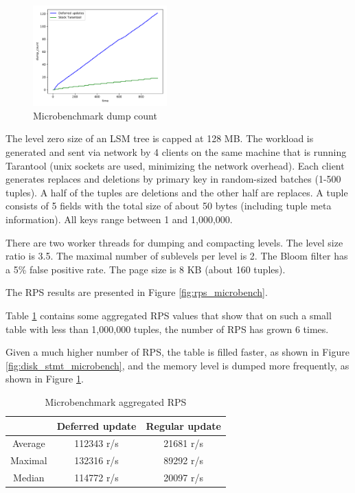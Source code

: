 \documentclass{vldb}
\begin{document}
\begin{figure}
\centering
\includegraphics[width=0.46\textwidth]{dump_count_microbench}
\caption{Microbenchmark dump count}
\label{fig:dump_count_microbench}
\end{figure}

The level zero size of an LSM tree is capped at 128 MB. The workload is generated and
sent via network by 4 clients on the same machine that is running Tarantool
(unix sockets are used, minimizing the network overhead). Each client generates
replaces and deletions by primary key in random-sized batches (1-500 tuples).
A half of the tuples are deletions and the other half are replaces. A tuple consists
of 5 fields with the total size of about 50 bytes (including tuple meta information). All
keys range between 1 and 1,000,000.

There are two worker threads for dumping and compacting levels. The level size ratio is
3.5. The maximal number of sublevels per level is 2. The Bloom filter has a 5\% false
positive rate. The page size is 8 KB (about 160 tuples).

The RPS results are presented in Figure \ref{fig:rps_microbench}.

Table \ref{table:rps_microbench} contains some aggregated RPS values that show
that on such a small table with less than 1,000,000 tuples, the number of RPS has 
grown 6 times.

Given a much higher number of RPS, the table is filled faster, as shown in Figure
\ref{fig:disk_stmt_microbench}, and the memory level is dumped more frequently, as
shown in Figure \ref{fig:dump_count_microbench}.

\begin{table}
\centering
\caption{Microbenchmark aggregated RPS}
\label{table:rps_microbench}
\begin{tabular}{|c|c|c|} \hline
\cellcolor{table_header}&
\cellcolor{table_header}Deferred update &
\cellcolor{table_header}Regular update\\ \hline

\cellcolor{table_header}Average &112343 r/s &21681 r/s\\ \hline
\cellcolor{table_header}Maximal &132316 r/s &89292 r/s\\ \hline
\cellcolor{table_header}Median &114772 r/s &20097 r/s\\
\hline\end{tabular}
\end{table}
\end{document}
